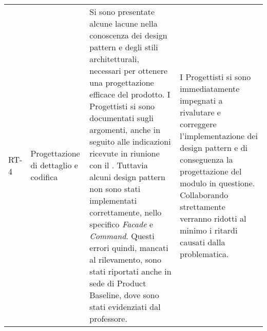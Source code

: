\begin{appendices}
\begin{longtable}{
		>{\centering}p{}
		>{\centering}p{}
		>{\centering\arraybackslash}p{}
		>{\centering\arraybackslash}p{} }
		RT-4
		&
		Progettazione di dettaglio e codifica
		&
		Si sono presentate alcune lacune nella conoscenza dei design pattern e degli stili architetturali, necessari per ottenere una progettazione efficace del prodotto. I Progettisti si sono documentati sugli argomenti, anche in seguito alle indicazioni ricevute in riunione con il \RC{}. Tuttavia alcuni design pattern non sono stati implementati correttamente, nello specifico \textit{Facade} e \textit{Command}. Questi errori quindi, mancati al rilevamento, sono stati riportati anche in sede di Product Baseline, dove sono stati evidenziati dal professore.
		&
		I Progettisti si sono immediatamente impegnati a rivalutare e correggere l'implementazione dei design pattern e di conseguenza la progettazione del modulo in questione. Collaborando strettamente verranno ridotti al minimo i ritardi causati dalla problematica.\\
	\end{longtable}
\end{appendices}

